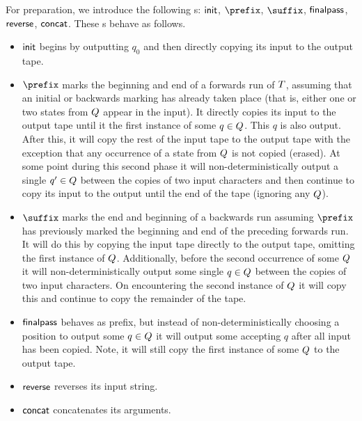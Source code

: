 {For preparation, we introduce the following \FT{}s:
    $\mathsf{init}$,
    $\prefix$,
    $\suffix$,
    $\mathsf{finalpass}$,
    $\mathsf{reverse}$,
    $\mathsf{concat}$.
These \FT{}s behave as follows.
\begin{itemize}
\item
    $\mathsf{init}$ begins by outputting $q_0$ and then directly copying its input to
    the output tape.

\item
    $\prefix$ marks the beginning and end of a forwards run of $T$,
    assuming that an initial or backwards marking has already taken place (that
    is, either one or two states from $Q$ appear in the input).
    It directly copies its input to the output tape until it the first instance
    of some
    $q \in Q$.
    This $q$ is also output.
    After this, it will copy the rest of the input tape to the output tape with
    the exception that any occurrence of a state from $Q$ is not copied
    (erased).
    At some point during this second phase it will non-deterministically output
    a single
    $q' \in Q$
    between the copies of two input characters and then continue to copy its
    input to the output until the end of the tape (ignoring any $Q$).

\item
    $\suffix$ marks the end and beginning of a backwards run assuming $\prefix$
    has previously marked the beginning and end of the preceding forwards run.
    It will do this by copying the input tape directly to the output tape,
    omitting the first instance of $Q$.
    Additionally, before the second occurrence of some $Q$ it will
    non-deterministically output some single $q \in Q$ between the
    copies of two input characters.
    On encountering the second instance of $Q$ it will copy this and
    continue to copy the remainder of the tape.

\item
    $\mathsf{finalpass}$ behaves as prefix, but instead of non-deterministically
    choosing a position to output some
    $q \in Q$
    it will output some accepting $q$ after all input has been copied.
    Note, it will still copy the first instance of some $Q$ to the
    output tape.

\item
    $\mathsf{reverse}$ reverses its input string.

\item
    $\mathsf{concat}$ concatenates its arguments.
\end{itemize}

}
